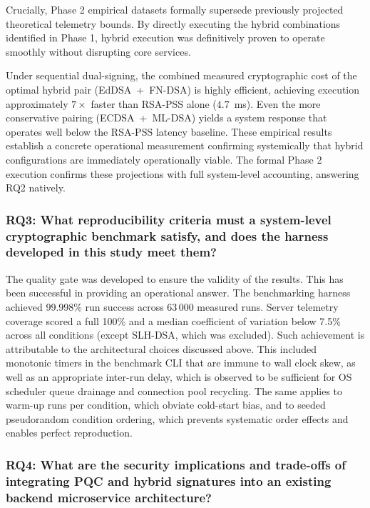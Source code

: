 \documentclass[12pt,a4paper]{article}
\begin{document}
Crucially, Phase 2 empirical datasets formally supersede previously projected theoretical telemetry bounds. By directly executing the hybrid combinations identified in Phase 1, hybrid execution was definitively proven to operate smoothly without disrupting core services.

Under sequential dual-signing, the combined measured cryptographic cost of the optimal hybrid pair (EdDSA~+~FN-DSA) is highly efficient, achieving execution approximately $7\times$ faster than RSA-PSS alone ($4.7$~ms). Even the more conservative pairing (ECDSA~+~ML-DSA) yields a system response that operates well below the RSA-PSS latency baseline. These empirical results establish a concrete operational measurement confirming systemically that hybrid configurations are immediately operationally viable. The formal Phase 2 execution confirms these projections with full system-level accounting, answering RQ2 natively.

\subsubsection{RQ3: What reproducibility criteria must a system-level cryptographic benchmark satisfy, and does the harness developed in this study meet them?}

The quality gate was developed to ensure the validity of the results. This has been successful in providing an operational answer. The benchmarking harness achieved 99.998\% run success across 63\,000 measured runs. Server telemetry coverage scored a full 100\% and a median coefficient of variation below 7.5\% across all conditions (except SLH-DSA, which was excluded). Such achievement is attributable to the architectural choices discussed above. This included monotonic timers in the benchmark CLI that are immune to wall clock skew, as well as an appropriate inter-run delay, which is observed to be sufficient for OS scheduler queue drainage and connection pool recycling. The same applies to warm-up runs per condition, which obviate cold-start bias, and to seeded pseudorandom condition ordering, which prevents systematic order effects and enables perfect reproduction.

\subsubsection{RQ4: What are the security implications and trade-offs of integrating PQC and hybrid signatures into an existing backend microservice architecture?}
\end{document}
